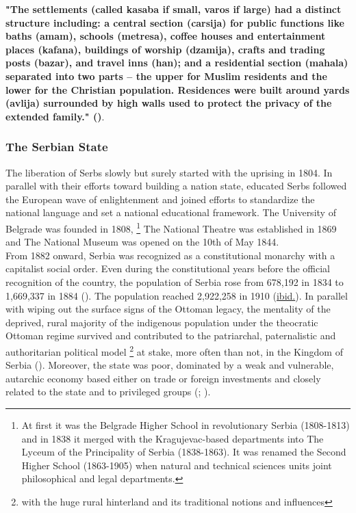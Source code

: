 \documentclass[11pt]{report}
\begin{document}
\textbf{"The settlements (called kasaba if small, varos if large) had a distinct structure including: a central section (carsija) for public functions like baths (amam), schools (metresa), coffee houses and entertainment places (kafana), buildings of worship (dzamija), crafts and trading posts (bazar), and travel inns (han); and a residential section (mahala) separated into two parts – the upper for Muslim residents and the lower for the Christian population. Residences were built around yards (avlija) surrounded by high walls used to protect the privacy of the extended family." (\href{Nedovic}{\citealt{nedovicbudic_waves_2006}})}.
 
\subsubsection{The Serbian State}

The  liberation  of  Serbs  slowly  but  surely  started  with  the  uprising  in  1804.   In parallel with  their  efforts  toward  building a  nation  state,  educated  Serbs  followed  the  European  wave  of enlightenment  and  joined  efforts  to  standardize  the  national  language  and  set  a  national educational framework. The University of Belgrade was founded in 1808,
\footnote{At first it was the Belgrade Higher School in revolutionary Serbia (1808-1813) and in 1838 it merged with the Kragujevac-based departments into The Lyceum of the Principality of Serbia (1838-1863). It was renamed the Second Higher School (1863-1905) when natural and technical sciences units joint philosophical and legal departments.}
The National Theatre was established in 1869 and The National Museum was opened on the 10th of May 1844.
\\

From 1882 onward, Serbia was recognized as a constitutional monarchy with a capitalist social order. Even during the constitutional years before the official recognition of the country, the population of Serbia rose from 678,192 in 1834 to 1,669,337 in 1884 (\href{Zavod}{\citealt{zavod_za_statistiku_i_evidenciju_nr_srbije_stanovnistvo_1953}}).
The population reached 2,922,258 in 1910 (\href{Zavod}{ibid.}). 
In parallel with wiping out the surface signs of the Ottoman legacy, the mentality of the deprived, rural majority of the indigenous population under the theocratic Ottoman regime survived and contributed to the patriarchal, paternalistic and authoritarian political model
\footnote{with the huge rural hinterland and its traditional notions and influences}
at stake, more often than not, in the Kingdom of Serbia (\href{Vukmirovic}{\citealt{vukmirovic_city_2013}}). Moreover, the state was poor, dominated by a weak and vulnerable, autarchic economy based either on trade or foreign investments and closely related to the state and to privileged groups (\href{Vukmirovic}{\citealt{vukmirovic_city_2013}}; \href{Samardzic}{\citealt{doytchinov_belgrade_2015}}).
\\
\end{document}
